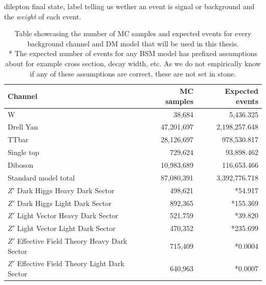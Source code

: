 \documentclass[12pt, a4paper]{book}
\begin{document}
dilepton final state, label telling us wether an event is signal or background and the \textit{weight} of each event.
\begin{table}[!h]
   \centering
    \caption[Dataset used for ML]{Table showcasing the number of MC samples and expected events for every background channel and DM model that will be used in this thesis.\\ * The expected number of events for any BSM model has prefixed assumptions about for example 
      cross section, decay width, etc. As we do not empirically know if any of these assumptions are correct, these are not set in stone.}
   \begin{tabular}{l|r|r}\midrule\midrule
      Channel                                                                         & MC samples            & Expected events  \\\midrule
      W                                                                               & 38,684                & 5,436.325        \\
      Drell Yan                                                                       & 47,201,697            & 2,198,257.648    \\
      TTbar                                                                           & 28,126,697            & 978,530.817      \\
      Single top                                                                      & 729,624               & 93,898.462       \\
      Diboson                                                                         & 10,983,689            & 116,653.466      \\\midrule
      Standard model total                                                            & 87,080,391            & 3,392,776.718    \\\midrule
      $Z'$ Dark Higgs Heavy Dark Sector                                               & 498,621               & *54.917         \\
      $Z'$ Dark Higgs Light Dark Sector                                               & 892,365               & *155.369         \\
      $Z'$ Light Vector Heavy Dark Sector                                             & 521,759               & *39.820         \\
      $Z'$ Light Vector Light Dark Sector                                             & 470,352               & *235.699         \\
      $Z'$ Effective Field Theory Heavy Dark Sector                                   & 715,409               & *0.0004           \\
      $Z'$ Effective Field Theory Light Dark Sector                                   & 640,963               & *0.0007          \\\midrule\midrule
   \end{tabular}
   \label{tab:dataset}
\end{table}
\end{document}
